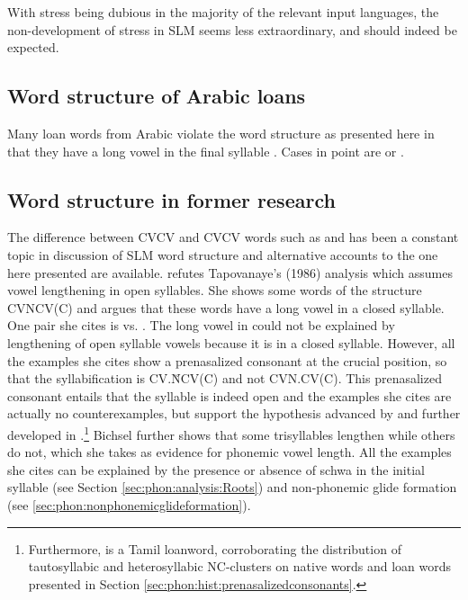 With stress being dubious in the majority of the relevant input languages, the non-development of stress in SLM seems less extraordinary, and should indeed be expected.



\subsection{Word structure of Arabic loans}\label{sec:phon:WordstructureofArabicloans}
Many loan words from Arabic violate the word structure as presented here in that they have a long vowel in the final syllable \citep[54,69]{Bichsel}. Cases in point are  or .


\subsection{Word structure in former research}\label{sec:phon:Wordstructureinformerresearch} 
The difference between CV\textipa{:}CV and CVC\textipa{:}V words such as  and  has been a constant topic in discussion of SLM word structure and alternative accounts to the one here presented are available. \citet{Bichsel} refutes Tapovanaye's (1986) \nocite{Tapovanaye1986} analysis which assumes vowel lengthening in open syllables. She shows some words of the structure CV\textipa{:}NCV(C) and argues that these words have a long vowel in a closed syllable. One pair she cites is  vs.  .
The long vowel in  could not be explained by lengthening of open syllable vowels because it is in a closed syllable. However, all the examples she cites show a prenasalized consonant at the crucial position, so that the syllabification is CV.\u{NC}V(C) and not CVN.CV(C). This prenasalized consonant entails that the syllable is indeed open and the examples she cites are actually no counterexamples, but support the hypothesis advanced by \citet{Tapovanaye1986} and further developed in \citet{Tapovanaye1995}.\footnote{Furthermore,  is a Tamil loanword, corroborating the distribution of tautosyllabic and heterosyllabic NC-clusters on native words and loan words presented in Section \ref{sec:phon:hist:prenasalizedconsonants}.}
Bichsel further shows that some trisyllables lengthen while others do not, which she takes as evidence for phonemic vowel length. All the examples she cites can be explained by the presence or absence of schwa in the initial syllable (see Section \ref{sec:phon:analysis:Roots}) and non-phonemic glide formation (see \ref{sec:phon:nonphonemicglideformation}).

